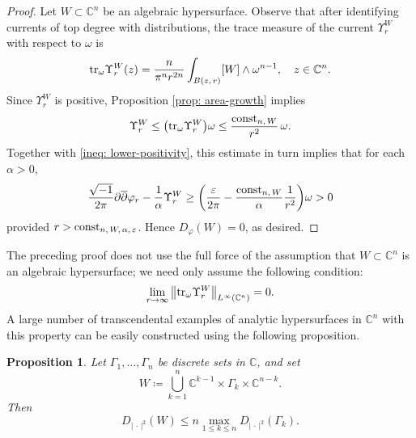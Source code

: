 \documentclass[12pt,a4paper]{amsart}
\numberwithin{equation}{section}
\newtheorem{proposition}[theorem]{Proposition}
\theoremstyle{definition}
\begin{document}
\begin{proof}
Let $W\subset\mathbb C^n$ be an algebraic hypersurface. Observe that after identifying currents of top degree with distributions, the trace measure of the current $\Upsilon^W_r$ with respect to $\omega$ is
\begin{equation*}\label{eq:trace-formula}
   {\rm tr}_{\omega}\Upsilon^W_r(z)=\frac{n}{\pi^n r^{2n}} \int_{B(z, \,r)} [W]\wedge \omega^{n-1},
   \quad z\in\mathbb C^n.
\end{equation*}
Since  $\Upsilon^W_r$ is positive, Proposition \ref{prop: area-growth} implies
  $$
  \Upsilon^W_r \leq \big({\rm tr}_{\omega}\Upsilon^W_r\big)\omega \leq \frac{{\rm const}_{n,\, W}}{r^2}\,\omega.
  $$
Together with \eqref{ineq: lower-positivity}, this estimate in turn implies that for each $\alpha>0$,
  $$
  \frac{\sqrt{-1}}{2\pi}\partial\overline{\partial}\varphi_r - \frac{1}{\alpha} \Upsilon^W_r
  \geq \bigg(\frac{\varepsilon}{2\pi}-\frac{{\rm const}_{n,\, W}}{\alpha}\frac{1}{r^2}\bigg)\omega>0
  $$
provided $r>{\rm const}_{n, \,W, \,\alpha, \,\varepsilon}$. Hence $D_{\varphi}(W)=0$, as desired.
\end{proof}



The preceding proof does not use the full force of the assumption that $W\subset\mathbb C^n$ is an algebraic hypersurface; we need only assume the following condition:
  $$
  \lim\limits_{r \to \infty}\big\|{\rm tr}_{\omega}\Upsilon^W_r\big\|_{L^{\infty}(\mathbb C^n)}=0.
  $$
A large number of transcendental examples of analytic hypersurfaces in $\mathbb C^n$ with this property can be easily constructed using the following proposition.


\begin{proposition}\label{prop:density-vanishing(trans-case)}
Let $\Gamma_1,\ldots, \Gamma_n$ be discrete sets in $\mathbb C$, and set
  $$
  W\coloneqq \bigcup_{k=1}^n \mathbb C^{k-1}\times\Gamma_k\times\mathbb C^{n-k}.
  $$
Then
  $$
  D_{|\,\cdot\,|^2}(W)\leq n \max_{1\leq k\leq n}D_{|\,\cdot\,|^2}(\Gamma_k).
  $$
\end{proposition}
\end{document}
